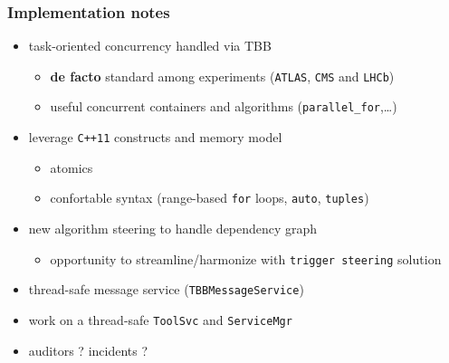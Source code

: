 \documentclass[10pt]{beamer}
\begin{document}
\begin{frame}[fragile]
\frametitle{Implementation notes}
\label{sec-1-11}


\begin{itemize}
\item task-oriented concurrency handled via \alert{TBB}
\begin{itemize}
\item \textbf{de facto} standard among experiments (\verb~ATLAS~, \verb~CMS~ and \verb~LHCb~)
\item useful concurrent containers and algorithms (\verb~parallel_for~,\ldots{})
\end{itemize}
\item leverage \verb~C++11~ constructs and memory model
\begin{itemize}
\item atomics
\item confortable syntax (range-based \verb~for~ loops, \verb~auto~, \verb~tuples~)
\end{itemize}
\item new algorithm steering to handle dependency graph
\begin{itemize}
\item \alert{opportunity} to streamline/harmonize with \verb~trigger steering~ solution
\end{itemize}
\item thread-safe message service (\verb~TBBMessageService~)
\item work on a thread-safe \verb~ToolSvc~ and \verb~ServiceMgr~
\item auditors ? incidents ?
\end{itemize}
\end{frame}
\end{document}
